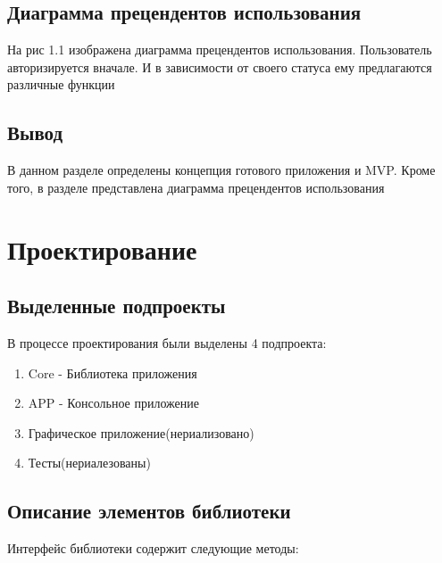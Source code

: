 \documentclass[12pt,a4paper]{report}
\begin{document}
\section{Диаграмма прецендентов использования}
\begin{figure}[h]
\caption{}
\label{fig:image}
\end{figure}
На рис 1.1 изображена диаграмма прецендентов использования. Пользователь авторизируется вначале. И в зависимости от своего статуса ему предлагаются различные функции

\section{Вывод}
В данном разделе определены концепция готового приложения и MVP. Кроме того, в разделе представлена диаграмма прецендентов использования 

\chapter{Проектирование}
\section{Выделенные подпроекты}
В процессе проектирования были выделены 4 подпроекта:
\begin{enumerate}
\item Core - Библиотека приложения
\item APP - Консольное приложение
\item Графическое приложение(нериализовано)
\item Тесты(нериалезованы)
\end{enumerate}
\section{Описание элементов библиотеки}
Интерфейс библиотеки содержит следующие методы:
\end{document}
